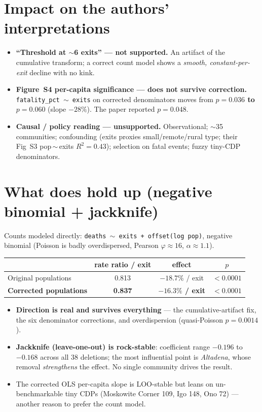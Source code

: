 \documentclass[9pt]{extarticle}
\begin{document}
\section*{Impact on the authors' interpretations}
\begin{itemize}
\item \textcolor{bad}{\textbf{``Threshold at $\sim$6 exits'' --- not supported.}} An artifact of the cumulative transform; a correct count model shows a \emph{smooth, constant-per-exit} decline with no kink.
\item \textcolor{bad}{\textbf{Figure~S4 per-capita significance --- does not survive correction.}} \texttt{fatality\_pct\,$\sim$\,exits} on corrected denominators moves from \textbf{$p=0.036$ to $p=0.060$} (slope $-28\%$). The paper reported $p=0.048$.
\item \textcolor{bad}{\textbf{Causal / policy reading --- unsupported.}} Observational; $\sim$35 communities; confounding (exits proxies small/remote/rural type; their Fig~S3 pop\,$\sim$\,exits $R^2=0.43$); selection on fatal events; fuzzy tiny-CDP denominators.
\end{itemize}

\section*{What does hold up (negative binomial + jackknife)}
Counts modeled directly: \texttt{deaths\,$\sim$\,exits\,+\,offset(log pop)}, negative binomial (Poisson is badly overdispersed, Pearson $\varphi\!\approx\!16$, $\alpha\!\approx\!1.1$).

\vspace{2pt}
{\footnotesize
\begin{tabular}{@{}lccc@{}}
\toprule
 & rate ratio / exit & effect & $p$\\
\midrule
Original populations  & 0.813 & $-18.7\%$ / exit & $<0.0001$\\
\textbf{Corrected populations} & \textbf{0.837} & \textbf{$-16.3\%$ / exit} & \textbf{$<0.0001$}\\
\bottomrule
\end{tabular}}

\begin{itemize}
\item \textcolor{good}{\textbf{Direction is real and survives everything}} --- the cumulative-artifact fix, the six denominator corrections, and overdispersion (quasi-Poisson $p=0.0014$).
\item \textcolor{good}{\textbf{Jackknife (leave-one-out) is rock-stable}}: coefficient range $-0.196$ to $-0.168$ across all 38 deletions; the most influential point is \emph{Altadena}, whose removal \emph{strengthens} the effect. No single community drives the result.
\item The corrected OLS per-capita slope is LOO-stable but leans on un-benchmarkable tiny CDPs (Moskowite Corner 109, Igo 148, Ono 72) --- another reason to prefer the count model.
\end{itemize}
\end{document}
